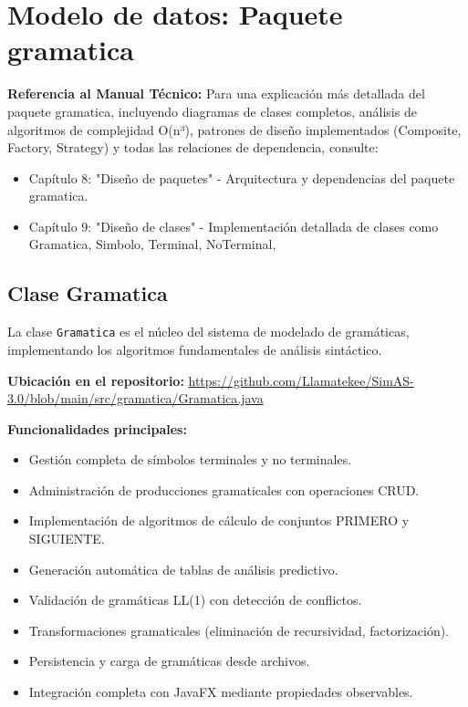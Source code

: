 \section{Modelo de datos: Paquete gramatica}

\textbf{Referencia al Manual Técnico:} Para una explicación más detallada del paquete gramatica, incluyendo diagramas de clases completos, análisis de algoritmos de complejidad O(n³), patrones de diseño implementados (Composite, Factory, Strategy) y todas las relaciones de dependencia, consulte:
\begin{itemize}
    \item Capítulo 8: "Diseño de paquetes" - Arquitectura y dependencias del paquete gramatica.
    \item Capítulo 9: "Diseño de clases" - Implementación detallada de clases como Gramatica, Simbolo, Terminal, NoTerminal,
\end{itemize}

\subsection{Clase Gramatica}

La clase \texttt{Gramatica} es el núcleo del sistema de modelado de gramáticas, implementando los algoritmos fundamentales de análisis sintáctico.

\textbf{Ubicación en el repositorio:} \url{https://github.com/Llamatekee/SimAS-3.0/blob/main/src/gramatica/Gramatica.java}

\textbf{Funcionalidades principales:}

\begin{itemize}
    \item Gestión completa de símbolos terminales y no terminales.
    \item Administración de producciones gramaticales con operaciones CRUD.
    \item Implementación de algoritmos de cálculo de conjuntos PRIMERO y SIGUIENTE.
    \item Generación automática de tablas de análisis predictivo.
    \item Validación de gramáticas LL(1) con detección de conflictos.
    \item Transformaciones gramaticales (eliminación de recursividad, factorización).
    \item Persistencia y carga de gramáticas desde archivos.
    \item Integración completa con JavaFX mediante propiedades observables.
\end{itemize}

